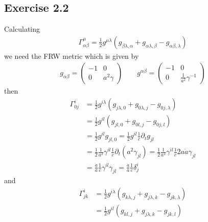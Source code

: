 \documentclass[10pt,a4paper]{book}
\theoremstyle{definition}
\begin{document}
\subsection{Exercise 2.2}
Calculating
\begin{align}
\Gamma^\mu_{\alpha\beta}=\frac{1}{2}g^{\mu\lambda}(g_{\beta\lambda,\alpha}+g_{\alpha\lambda,\beta}-g_{\alpha\beta,\lambda})
\end{align}
we need the FRW metric which is given by
\begin{align}
g_{\alpha\beta}=\left(\begin{array}{cc}
-1&0\\
0&a^2\gamma
\end{array}
\right)\qquad
g^{\alpha\beta}=\left(\begin{array}{cc}
-1&0\\
0&\frac{1}{a^2}\gamma^{-1}
\end{array}
\right)
\end{align}
then
\begin{align}
\Gamma^i_{0j}
&=\frac{1}{2}g^{i\lambda}(g_{j\lambda,0}+g_{0\lambda,j}-g_{0j,\lambda})\\
&=\frac{1}{2}g^{il}(g_{jl,0}+g_{0l,j}-g_{0j,l})\\
&=\frac{1}{2}g^{il}g_{jl,0}=\frac{1}{2}g^{il}\frac{1}{c}\partial_tg_{jl}\\
&=\frac{1}{2}\frac{1}{a^2}\gamma^{il}\frac{1}{c}\partial_t(a^2\gamma_{jl})=\frac{1}{2}\frac{1}{a^2}\gamma^{il}\frac{1}{c}2a\dot a\gamma_{jl}\\
&=\frac{\dot a}{a}\frac{1}{c}\gamma^{il}\gamma_{jl}=\frac{\dot a}{a}\frac{1}{c}\delta^i_j
\end{align}
and
\begin{align}
\Gamma^i_{jk}
&=\frac{1}{2}g^{i\lambda}(g_{k\lambda,j}+g_{j\lambda,k}-g_{jk,\lambda})\\
&=\frac{1}{2}g^{il}(g_{kl,j}+g_{j\lambda,k}-g_{jk,l})
\end{align}
\end{document}
